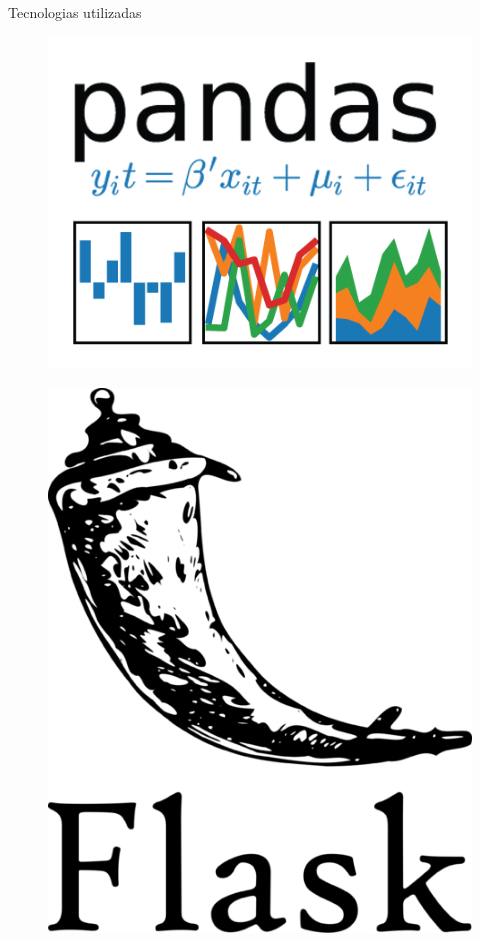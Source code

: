 \documentclass[10pt]{beamer}
\begin{document}
\begin{frame}{Tecnologias utilizadas}
\begin{multicols}{4}
\begin{figure}
            \includegraphics[width=\linewidth]{demo/images/pandas.png}
            \label{fig:pandas}
        \end{figure}
        \begin{figure}
            \centering
            \includegraphics[width=\linewidth]{demo/images/flask.png}

\end{figure}
\end{multicols}
\end{frame}
\end{document}
